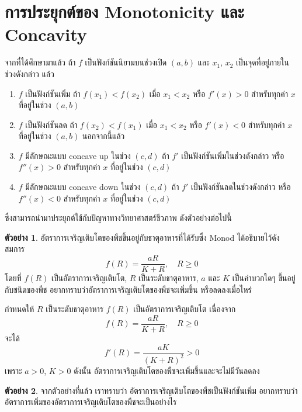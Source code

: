 \documentclass[
]{book}
\theoremstyle{definition}
\theoremstyle{definition}
\newtheorem{example}{ตัวอย่าง}[chapter]
\theoremstyle{definition}
\theoremstyle{definition}
\theoremstyle{remark}
\begin{document}
\section{การประยุกต์ของ Monotonicity และ Concavity}\label{uxe01uxe32uxe23uxe1buxe23uxe30uxe22uxe01uxe15uxe02uxe2duxe07-monotonicity-uxe41uxe25uxe30-concavity}

จากที่ได้ศึกษามาแล้ว ถ้า \(f\) เป็นฟังก์ชันนิยามบนช่วงเปิด \((a,b)\) และ \(x_1\), \(x_2\)
เป็นจุดที่อยู่ภายในช่วงดังกล่าว แล้ว

\begin{enumerate}
\def\labelenumi{(\arabic{enumi})}
\item
  \(f\) เป็นฟังก์ชันเพิ่ม ถ้า \(f(x_1)<f(x_2)\) เมื่อ \(x_1<x_2\) หรือ \(f'(x)>0\)
  สำหรับทุกค่า \(x\) ที่อยู่ในช่วง \((a,b)\)
\item
  \(f\) เป็นฟังก์ชันลด ถ้า \(f(x_2)<f(x_1)\) เมื่อ \(x_1<x_2\) หรือ \(f'(x)<0\)
  สำหรับทุกค่า \(x\) ที่อยู่ในช่วง \((a,b)\) นอกจากนี้แล้ว
\item
  \(f\) มีลักษณะแบบ concave up ในช่วง \((c,d)\) ถ้า \(f'\)
  เป็นฟังก์ชันเพิ่มในช่วงดังกล่าว หรือ \(f''(x)>0\) สำหรับทุกค่า \(x\) ที่อยู่ในช่วง \((c,d)\)
\item
  \(f\) มีลักษณะแบบ concave down ในช่วง \((c,d)\) ถ้า \(f'\)
  เป็นฟังก์ชันลดในช่วงดังกล่าว หรือ \(f''(x)<0\) สำหรับทุกค่า \(x\) ที่อยู่ในช่วง \((c,d)\)
\end{enumerate}

ซึ่งสามารถนำมาประยุกต์ใช้กับปัญหาทางวิทยาศาสตร์ชีวภาพ ดังตัวอย่างต่อไปนี้

\begin{example}
อัตราการเจริญเติบโตของพืชขึ้นอยู่กับธาตุอาหารที่ได้รับซึ่ง Monod ได้อธิบายไว้ดังสมการ
\[f(R)=\frac{aR}{K+R}, \quad R \ge 0\] โดยที่ \(f(R)\) เป็นอัตราการเจริญเติบโต,
\(R\) เป็นระดับธาตุอาหาร, \(a\) และ \(K\) เป็นค่าบวกใดๆ ขึ้นอยู่กับชนิดของพืช
อยากทราบว่าอัตราการเจริญเติบโตของพืชจะเพิ่มขึ้น หรือลดลงเมื่อไหร่
\end{example}

กำหนดให้ \(R\) เป็นระดับธาตุอาหาร \(f(R)\) เป็นอัตราการเจริญเติบโต เนื่องจาก
\[f(R)=\frac{aR}{K+R},  \quad      R \ge 0\] จะได้
\[f'(R)=\frac{aK}{(K+R)^2}>0\] เพราะ \(a>0\), \(K>0\) ดังนั้น
อัตราการเจริญเติบโตของพืชจะเพิ่มขึ้นและจะไม่มีวันลดลง

\begin{example}
จากตัวอย่างที่แล้ว เราทราบว่า อัตราการเจริญเติบโตของพืชเป็นฟังก์ชันเพิ่ม
อยากทราบว่าอัตราการเพิ่มของอัตราการเจริญเติบโตของพืชจะเป็นอย่างไร
\end{example}
\end{document}
